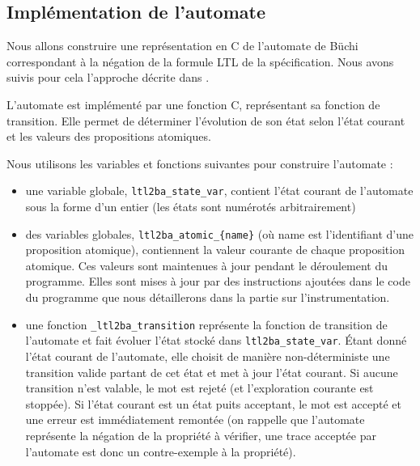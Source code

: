 \subsection{Implémentation de l'automate}

Nous allons construire une représentation en C de l'automate de Büchi
correspondant à la négation de la formule LTL de la spécification. Nous
avons suivis pour cela l'approche décrite dans \cite{morse_ltl}.

L'automate est implémenté par une fonction C, représentant sa fonction
de transition. Elle permet de déterminer l'évolution de son état selon
l'état courant et les valeurs des propositions atomiques.

Nous utilisons les variables et fonctions suivantes pour construire
l'automate :

\begin{itemize}
\item
  une variable globale, \lstinline!ltl2ba_state_var!, contient l'état
  courant de l'automate sous la forme d'un entier (les états sont
  numérotés arbitrairement)
\item
  des variables globales, \lstinline!ltl2ba_atomic_{name}! (où name est
  l'identifiant d'une proposition atomique), contiennent la valeur
  courante de chaque proposition atomique. Ces valeurs sont maintenues à
  jour pendant le déroulement du programme. Elles sont mises à jour par
  des instructions ajoutées dans le code du programme que nous
  détaillerons dans la partie sur l'instrumentation.
\item
  une fonction \lstinline!_ltl2ba_transition! représente la fonction de
  transition de l'automate et fait évoluer l'état stocké dans
  \lstinline!ltl2ba_state_var!. Étant donné l'état courant de
  l'automate, elle choisit de manière non-déterministe une transition
  valide partant de cet état et met à jour l'état courant. Si aucune
  transition n'est valable, le mot est rejeté (et l'exploration courante
  est stoppée). Si l'état courant est un état puits acceptant, le mot
  est accepté et une erreur est immédiatement remontée (on rappelle que
  l'automate représente la négation de la propriété à vérifier, une
  trace acceptée par l'automate est donc un contre-exemple à la
  propriété).


\end{itemize}
